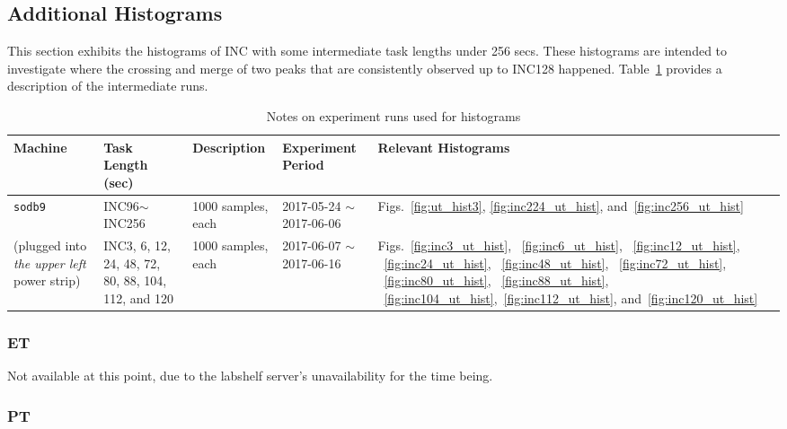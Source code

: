 \subsection{Additional Histograms}
This section exhibits the histograms of INC with some intermediate task lengths under 256 secs. 
These histograms are intended to investigate where the crossing and merge of two peaks that are consistently observed up to INC128 
happened. Table~\ref{tab:exp_notes4} provides a description of the intermediate runs. 
\begin{table}[h]
\begin{center}
\begin{tabular}{|p{2cm}|p{3cm}|p{3cm}|p{4cm}|p{3.5cm}|} \hline
Machine & Task Length (sec) & Description & Experiment Period & Relevant \linebreak Histograms\\ \hline
{\tt sodb9} &  INC96$\sim$INC256 & 1000 samples, each & 2017-05-24 $\sim$ 2017-06-06 & Figs.~\ref{fig:ut_hist3}, \ref{fig:inc224_ut_hist}, and~\ref{fig:inc256_ut_hist}\\ \cline{2-4}
(plugged into {\em the upper left} power strip)	&  INC3, 6, 12, 24, 48, 72, 80, 88, 104, 112, and 120 & 1000 samples, each & 2017-06-07 $\sim$ 2017-06-16 & Figs.~\ref{fig:inc3_ut_hist}, ~\ref{fig:inc6_ut_hist}, ~\ref{fig:inc12_ut_hist}, ~\ref{fig:inc24_ut_hist},
~\ref{fig:inc48_ut_hist}, ~\ref{fig:inc72_ut_hist}, ~\ref{fig:inc80_ut_hist}, ~\ref{fig:inc88_ut_hist}, ~\ref{fig:inc104_ut_hist},~\ref{fig:inc112_ut_hist}, and~\ref{fig:inc120_ut_hist}\\ \hline
\end{tabular}
\end{center}
\vspace{-.2in}
\caption{Notes on experiment runs used for histograms\label{tab:exp_notes4}}
\end{table}

\subsubsection{ET}
Not available at this point, due to the labshelf server's unavailability for the time being.

\pagebreak

\subsubsection{PT}

